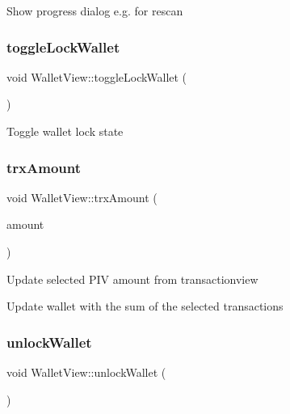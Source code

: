 Show progress dialog e.\+g. for rescan \mbox{\label{class_wallet_view_a739b3c92d336efb3cf1249a84d4deeab}} 
\subsubsection{\texorpdfstring{toggle\+Lock\+Wallet}{toggleLockWallet}}
{\footnotesize\ttfamily void Wallet\+View\+::toggle\+Lock\+Wallet (\begin{DoxyParamCaption}{ }\end{DoxyParamCaption})\hspace{0.3cm}{\ttfamily [slot]}}

Toggle wallet lock state \mbox{\label{class_wallet_view_ac4206b008b9c16dd6931aa56d9fb6fd4}} 
\subsubsection{\texorpdfstring{trx\+Amount}{trxAmount}}
{\footnotesize\ttfamily void Wallet\+View\+::trx\+Amount (\begin{DoxyParamCaption}\item[{Q\+String}]{amount }\end{DoxyParamCaption})\hspace{0.3cm}{\ttfamily [slot]}}

Update selected P\+IV amount from transactionview

Update wallet with the sum of the selected transactions \mbox{\label{class_wallet_view_ac258d549f0e55ad4f84b9d21848faf02}} 
\subsubsection{\texorpdfstring{unlock\+Wallet}{unlockWallet}}
{\footnotesize\ttfamily void Wallet\+View\+::unlock\+Wallet (\begin{DoxyParamCaption}{ }\end{DoxyParamCaption})\hspace{0.3cm}{\ttfamily [slot]}}


